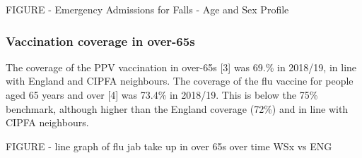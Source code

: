 FIGURE - Emergency Admissions for Falls - Age and Sex Profile

\subsubsection{Vaccination coverage in over-65s}
The coverage of the PPV vaccination in over-65s [3] was 69.\% in 2018/19, in line with England and CIPFA neighbours. The coverage of the flu vaccine for people aged 65 years and over [4] was 73.4\% in 2018/19. This is below the 75\% benchmark, although higher than the England coverage (72\%) and in line with CIPFA neighbours.

FIGURE - line graph of flu jab take up in over 65s over time WSx vs ENG







